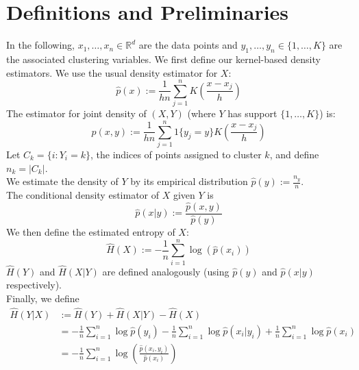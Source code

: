 \documentclass{article} %
\begin{document}
\newpage
\section{Definitions and Preliminaries}
In the following, $x_1, \dots, x_n \in \mathbb{R}^d$ are the data points and $y_1, \dots, y_n \in \{1, \dots, K\}$ are the associated clustering variables. We first define our kernel-based density estimators. We use the usual density estimator for $X$:
\[ \hat{p}(x) := \frac{1}{hn}\sum_{j=1}^n K(\frac{x - x_j}{h}) \]
The estimator for joint density of $(X, Y)$ (where $Y$ has support $\{1, \dots, K\}$) is:
\[ \hat{p}(x, y) := \frac{1}{hn}\sum_{j=1}^n 1\{y_j=y\} K(\frac{x - x_j}{h}) \]
Let $C_k = \{i: Y_i = k\}$, the indices of points assigned to cluster $k$, and define $n_k = |C_k|$.\\
We estimate the density of $Y$ by its empirical distribution $\hat{p}(y) := \frac{n_y}{n}$.\\
The conditional density estimator of $X$ given $Y$ is
\[ \hat{p}(x | y) := \frac{\hat{p}(x, y)}{\hat{p}(y)} \]
We then define the estimated entropy of $X$:
\[\hat{H}(X) := - \frac{1}{n} \sum_{i=1}^n \log(\hat{p}(x_i)) \]
$\hat{H}(Y)$ and $\hat{H}(X|Y)$ are defined analogously (using $\hat{p}(y)$ and $\hat{p}(x | y)$ respectively).\\
Finally, we define
\begin{align*}
\hat{H}(Y|X) &:= \hat{H}(Y) + \hat{H}(X|Y) - \hat{H}(X) \\
&= -\frac{1}{n}\sum_{i=1}^n \log \hat{p}(y_i) -\frac{1}{n}\sum_{i=1}^n \log \hat{p}(x_i | y_i) + \frac{1}{n}\sum_{i=1}^n \log \hat{p}(x_i) \\
&= -\frac{1}{n}\sum_{i=1}^n \log \left( \frac{\hat{p}(x_i, y_i)}{\hat{p}(x_i)} \right)
\end{align*} 
\end{document}
